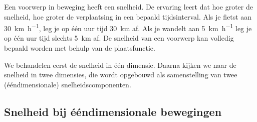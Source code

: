 \documentclass{ximera}
\begin{document}
	\author{Bart Lambregs,Vincent Gellens}
    \xmsource\xmuitleg





Een voorwerp in beweging heeft een snelheid. 
De ervaring leert dat hoe groter de snelheid, hoe groter de verplaatsing in een bepaald tijdsinterval. 
Als je fietst aan \SI{30}{\kilo\meter\per\hour}, leg je op één uur tijd \SI{30}{km} af. 
Als je wandelt aan \SI{5}{\kilo\meter\per\hour} leg je op één uur tijd slechts \SI{5}{km} af. 
De snelheid van een voorwerp kan volledig bepaald worden met behulp van de plaatsfunctie. 

We behandelen eerst de snelheid in één dimensie. 
Daarna kijken we naar de snelheid in twee dimensies, die wordt opgebouwd als samenstelling van twee (ééndimensionale) snelheidscomponenten. 





\subsection*{Snelheid bij ééndimensionale bewegingen}
\end{document}
